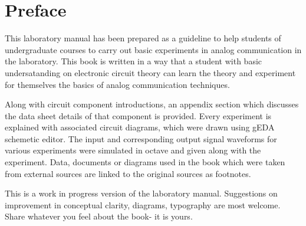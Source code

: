 \chapter*{Preface} 

This laboratory manual has been prepared as a guideline to help students of undergraduate courses to carry out basic experiments in analog communication in the laboratory. This book is written in a way that a student with basic undersatanding on electronic circuit theory can learn the theory and experiment for themselves the basics of analog communication techniques. 

Along with circuit component introductions, an appendix section which discusses the data sheet details of that component is provided. Every experiment is explained with associated circuit diagrams, which were drawn using gEDA schemetic editor. The input and corresponding output signal waveforms for various experiments were simulated in octave and given along with the experiment. Data, documents or diagrams used in the 
book which were taken from external sources are linked to the original sources as footnotes.

This is a work in progress version of the laboratory manual. Suggestions on improvement in conceptual clarity, diagrams, typography are most welcome. Share whatever you feel about the book- it is yours.


